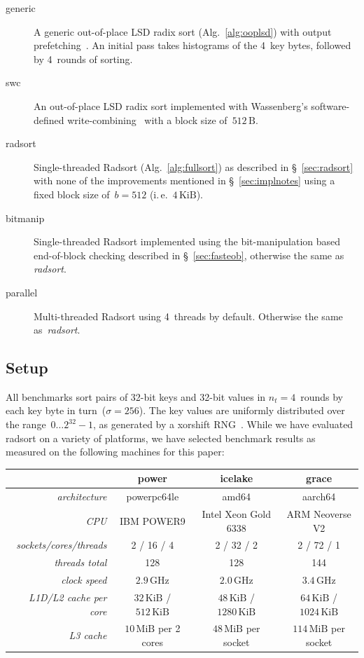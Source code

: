 \documentclass[nolineno,a4paper,UKenglish,cleveref, autoref, thm-restate]{socg-lipics-v2021}
\begin{document}
\begin{description}
\item[generic]
A generic out-of-place LSD radix sort (Alg.~\ref{alg:ooplsd}) with
output prefetching~\cite{Downs2019}.  An initial pass takes histograms
of the 4~key bytes, followed by 4~rounds of sorting.
\item[swc]
An out-of-place LSD radix sort implemented with Wassenberg's
soft\-ware-de\-fi\-ned write-com\-bin\-ing~\cite{Wassenberg2010}
with a block size of~$512\,\mathrm B$.
\item[radsort]
Single-threaded Radsort (Alg.~\ref{alg:fullsort}) as described in \S~\ref{sec:radsort} with
none of the improvements mentioned in \S~\ref{sec:implnotes} using a fixed
block size of~$b=512$ (i.\,e.~$4\,\mathrm{KiB}$).
\item[bitmanip]
Single-threaded Radsort implemented using the bit-manipulation based end-of-block
checking described in \S~\ref{sec:fasteob}, otherwise the same as \emph{radsort}.
\item[parallel]
Multi-threaded Radsort using 4~threads by default.  Otherwise
the same as~\emph{radsort}.
\end{description}

\subsection{Setup}
All benchmarks sort pairs of 32-bit keys and 32-bit values in $n_t=4$~rounds
by each key byte in turn~($\sigma=256$).
The key values are uniformly distributed over the
range~$0\ldots2^{32}-1$, as generated by a xorshift RNG~\cite{Marsaglia2003}.
While we have evaluated radsort on a variety of platforms, we have
selected benchmark results as measured on the following machines for this
paper:

\vspace{\abovedisplayskip}
\def\tblheading#1{\textcolor{lipicsGray}{\sffamily\bfseries\mathversion{bold}#1}}
\begin{centering}
\begin{tabular}{rccc}
\toprule
&\tblheading{power}&\tblheading{icelake}&\tblheading{grace}\\
\midrule
\emph{architecture}&powerpc64le&amd64&aarch64\\
\emph{CPU}&IBM POWER9&Intel Xeon Gold 6338&ARM Neoverse V2\\
\emph{sockets/cores/threads}&2 / 16 / 4&2 / 32 / 2&2 / 72 / 1\\
\emph{threads total}&128&128&144\\
\emph{clock speed}&$2.9\,\mathrm{GHz}$&$2.0\,\mathrm{GHz}$&$3.4\,\mathrm{GHz}$\\
\emph{L1D/L2 cache per core}&$32\,\mathrm{KiB}$ / $512\,\mathrm{KiB}$&$48\,\mathrm{KiB}$ / $1280\,\mathrm{KiB}$&$64\,\mathrm{KiB}$ / $1024\,\mathrm{KiB}$\\
\emph{L3 cache}&$10\,\mathrm{MiB}$ per 2 cores&$48\,\mathrm{MiB}$ per socket&$114\,\mathrm{MiB}$ per socket\\
\bottomrule
\end{tabular}
\end{centering}
\vspace{\belowdisplayskip}
\end{document}
